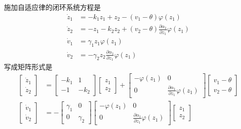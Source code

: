 \begin{note}
    施加自适应律的闭环系统方程是
\begin{align*}
  \dot{z}_1 & = - k_1 z_1 + z_2 - (v_1 - \theta) \varphi (z_1)\\
  \dot{z}_2 & = - z_1 - k_2 z_2 + (v_2 - \theta) \frac{\partial
  \alpha_1}{\partial z_1} \varphi (z_1)\\
  \dot{v}_1 & = \gamma_1 z_1 \varphi (z_1)\\
  \dot{v}_2 & = - \gamma_2 z_2 \frac{\partial \alpha_1}{\partial z_1}
  \varphi (z_1)
\end{align*}
写成矩阵形式是
\begin{align*}
  \left[\begin{array}{c}
    \dot{z}_1\\
    \dot{z}_2
  \end{array}\right] & = \left[\begin{array}{cc}
    - k_1 & 1\\
    - 1 & - k_2
  \end{array}\right] \left[\begin{array}{c}
    z_1\\
    z_2
  \end{array}\right] + \left[\begin{array}{cc}
    - \varphi (z_1) & 0\\
    0 & \frac{\partial \alpha_1}{\partial z_1} \varphi (z_1)
  \end{array}\right] \left[\begin{array}{c}
    v_1 - \theta\\
    v_2 - \theta
  \end{array}\right]\\
  \left[\begin{array}{c}
    \dot{v}_1\\
    \dot{v}_2
  \end{array}\right] & = - \left[\begin{array}{cc}
    \gamma_1 & 0\\
    0 & \gamma_2
  \end{array}\right] \left[\begin{array}{cc}
    - \varphi (z_1) & 0\\
    0 & \frac{\partial \alpha_1}{\partial z_1} \varphi (z_1)
  \end{array}\right] \left[\begin{array}{c}
    z_1\\
    z_2
  \end{array}\right]
\end{align*}
\end{note}

